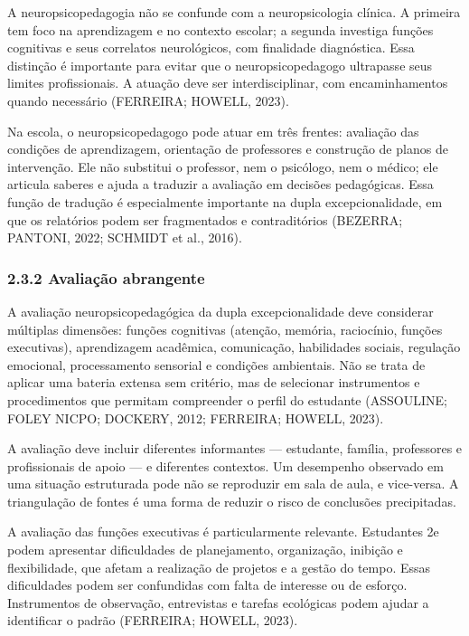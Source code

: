 A neuropsicopedagogia não se confunde com a neuropsicologia clínica. A
primeira tem foco na aprendizagem e no contexto escolar; a segunda
investiga funções cognitivas e seus correlatos neurológicos, com
finalidade diagnóstica. Essa distinção é importante para evitar que o
neuropsicopedagogo ultrapasse seus limites profissionais. A atuação deve
ser interdisciplinar, com encaminhamentos quando necessário (FERREIRA;
HOWELL, 2023).

Na escola, o neuropsicopedagogo pode atuar em três frentes: avaliação
das condições de aprendizagem, orientação de professores e construção de
planos de intervenção. Ele não substitui o professor, nem o psicólogo,
nem o médico; ele articula saberes e ajuda a traduzir a avaliação em
decisões pedagógicas. Essa função de tradução é especialmente importante
na dupla excepcionalidade, em que os relatórios podem ser fragmentados e
contraditórios (BEZERRA; PANTONI, 2022; SCHMIDT et al., 2016).

\subsubsection{2.3.2 Avaliação
abrangente}\label{avaliauxe7uxe3o-abrangente}

A avaliação neuropsicopedagógica da dupla excepcionalidade deve
considerar múltiplas dimensões: funções cognitivas (atenção, memória,
raciocínio, funções executivas), aprendizagem acadêmica, comunicação,
habilidades sociais, regulação emocional, processamento sensorial e
condições ambientais. Não se trata de aplicar uma bateria extensa sem
critério, mas de selecionar instrumentos e procedimentos que permitam
compreender o perfil do estudante (ASSOULINE; FOLEY NICPO; DOCKERY,
2012; FERREIRA; HOWELL, 2023).

A avaliação deve incluir diferentes informantes --- estudante, família,
professores e profissionais de apoio --- e diferentes contextos. Um
desempenho observado em uma situação estruturada pode não se reproduzir
em sala de aula, e vice-versa. A triangulação de fontes é uma forma de
reduzir o risco de conclusões precipitadas.

A avaliação das funções executivas é particularmente relevante.
Estudantes 2e podem apresentar dificuldades de planejamento,
organização, inibição e flexibilidade, que afetam a realização de
projetos e a gestão do tempo. Essas dificuldades podem ser confundidas
com falta de interesse ou de esforço. Instrumentos de observação,
entrevistas e tarefas ecológicas podem ajudar a identificar o padrão
(FERREIRA; HOWELL, 2023).


